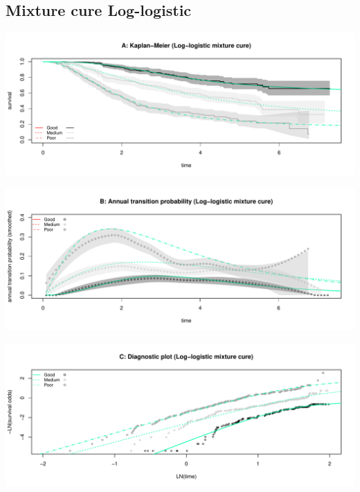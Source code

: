 \documentclass[]{article}
\begin{document}
\subsection{Mixture cure Log-logistic}\label{mixture-cure-log-logistic}

\begin{flushleft}\includegraphics[height=0.25\textheight]{Images/cure_llog_mix-1} \end{flushleft}

\begin{flushleft}\includegraphics[height=0.25\textheight]{Images/cure_llog_mix-2} \end{flushleft}

\begin{flushleft}\includegraphics[height=0.25\textheight]{Images/cure_llog_mix-3} \end{flushleft}

\newpage
\end{document}
